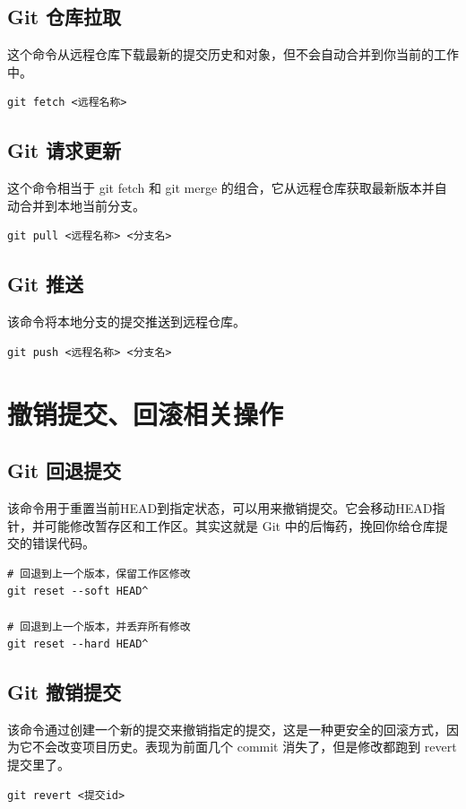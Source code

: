 \documentclass[UTF8]{gyh}
\begin{document}
\subsection{Git 仓库拉取}
这个命令从远程仓库下载最新的提交历史和对象，但不会自动合并到你当前的工作中。
\begin{lstlisting}
git fetch <远程名称>
\end{lstlisting}

\subsection{Git 请求更新}
这个命令相当于 git fetch 和 git merge 的组合，它从远程仓库获取最新版本并自动合并到本地当前分支。
\begin{lstlisting}
git pull <远程名称> <分支名>
\end{lstlisting}

\subsection{Git 推送}
该命令将本地分支的提交推送到远程仓库。
\begin{lstlisting}
git push <远程名称> <分支名>
\end{lstlisting}

\section{撤销提交、回滚相关操作}

\subsection{Git 回退提交}
该命令用于重置当前HEAD到指定状态，可以用来撤销提交。它会移动HEAD指针，并可能修改暂存区和工作区。其实这就是 Git 中的后悔药，挽回你给仓库提交的错误代码。
\begin{lstlisting}
# 回退到上一个版本，保留工作区修改
git reset --soft HEAD^

# 回退到上一个版本，并丢弃所有修改
git reset --hard HEAD^
\end{lstlisting}

\subsection{Git 撤销提交}
该命令通过创建一个新的提交来撤销指定的提交，这是一种更安全的回滚方式，因为它不会改变项目历史。表现为前面几个 commit 消失了，但是修改都跑到 revert 提交里了。
\begin{lstlisting}
git revert <提交id>
\end{lstlisting}
\end{document}
